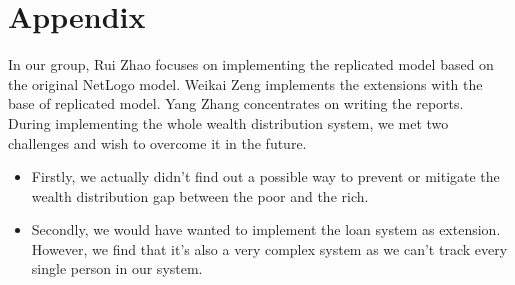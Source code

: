 \section*{Appendix}
In our group, Rui Zhao focuses on implementing the replicated model based on the original NetLogo model. Weikai Zeng implements the extensions with the base of replicated model. Yang Zhang concentrates on writing the reports.\\

During implementing the whole wealth distribution system, we met two challenges and wish to overcome it in the future.
\begin{itemize}
	\item Firstly, we actually didn't find out a possible way to prevent or mitigate the wealth distribution gap between the poor and the rich. 
	\item Secondly, we would have wanted to implement the loan system as extension. However, we find
	that it's also a very complex system as we can't track every single person in our system.
\end{itemize} 


